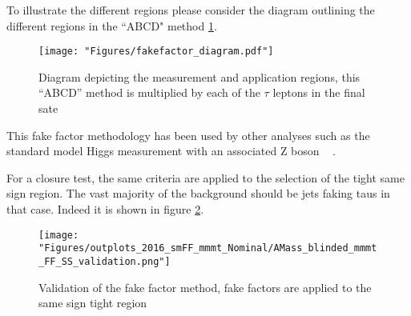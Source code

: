 To illustrate the different regions please consider the diagram outlining the different regions in the ``ABCD" method \ref{fig:fakefactor_reg}. 
\begin{figure}[ht!b]
  \texttt{[image: "Figures/fakefactor\_diagram.pdf"]}
    \caption{\label{fig:fakefactor_reg} Diagram depicting the measurement and application regions, this ``ABCD'' method is multiplied by each of the $\tau$ leptons in the final sate}
\end{figure}

This fake factor methodology has been used by other analyses such as the standard model Higgs measurement with an associated Z boson ~\cite{CMS-PAS-HIG-19-010} . 

For a closure test, the same criteria are applied to the selection of the tight same sign region. The vast majority of the background should be jets faking taus in that case. Indeed it is shown in figure \ref{fig:fakefactor_validation}.
  
\begin{figure}[ht!b]
  \texttt{[image: "Figures/outplots\_2016\_smFF\_mmmt\_Nominal/AMass\_blinded\_mmmt\_FF\_SS\_validation.png"]}
    \caption{\label{fig:fakefactor_validation} Validation of the fake factor method, fake factors are applied to the same sign tight region}
\end{figure}
